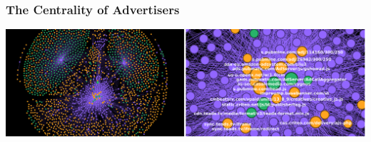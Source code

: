 \documentclass[aspectratio=169]{beamer}
\renewcommand{\large}{\fontsize{16pt}{24pt}\selectfont}
\begin{document}
\begin{frame}
\frametitle{The Centrality of Advertisers}
\large{Are trackers the new backbone of the Web?}
\begin{center}
\includegraphics[width=0.85\paperwidth]{0thN-8lZ4H2_xjbkt.png}
\end{center}







\end{frame}
\end{document}
